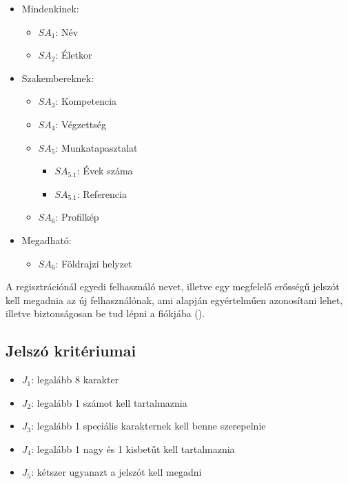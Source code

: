 \begin{itemize}
    \item Mindenkinek:
    \begin{itemize}
        \item ${SA}_1$: Név
        \item ${SA}_2$: Életkor
    \end{itemize}
    \item Szakembereknek:
    \begin{itemize}
        \item ${SA}_3$: Kompetencia
        \item ${SA}_4$: Végzettség
        \item ${SA}_5$: Munkatapasztalat
        \begin{itemize}
            \item ${SA}_{5.1}$: Évek száma
            \item ${SA}_{5.1}$: Referencia
        \end{itemize}
        \item  ${SA}_6$: Profilkép
    \end{itemize}
    
    \item Megadható:
    \begin{itemize}
        \item ${SA}_6$: Földrajzi helyzet
    \end{itemize}
\end{itemize}

A regisztrációnál egyedi felhasználó nevet, illetve egy megfelelő erősségű jelszót kell megadnia az új felhasználónak, ami alapján egyértelműen azonosítani lehet, illetve biztonságosan be tud lépni a fiókjába ().

\subsection{Jelszó kritériumai}

\begin{itemize}
    \item $J_1$: legalább 8 karakter
    \item $J_2$: legalább 1 számot kell tartalmaznia
    \item $J_3$: legalább 1 speciális karakternek kell benne szerepelnie
    \item $J_4$: legalább 1 nagy és 1 kisbetűt kell tartalmaznia
    \item $J_5$: kétszer ugyanazt a jelszót kell megadni
\end{itemize}

